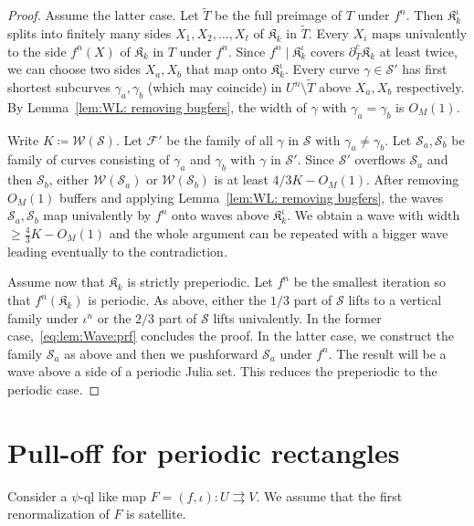 \documentclass{amsart}
\newcommand{\filled}{{\mathfrak K }}
\newcommand{\1}{{\mathbb 1 }}
\newcommand{\Fam}{{\mathcal F}}
\newcommand{\FamS}{{\mathcal S}}
\newcommand{\Width}{{\mathcal W}}
\begin{document}
\begin{proof}
Assume the latter case. Let $\widetilde T$ be the full preimage of $T$ under $f^n$. Then $\filled_k^\iota$ splits into finitely many sides $X_1,X_2,\dots, X_t$ of $\filled_k$ in $\widetilde T$. Every $X_i$ maps univalently to the side $f^n(X)$ of $\filled_k$ in $T$ under $f^n$. Since $f^n\mid \filled_k^\iota$ covers $\partial^c_T \filled_k$ at least twice, we can choose two sides $X_a,X_b$ that map onto $\filled^\iota_k$. Every curve $\gamma\in \FamS'$ has first shortest subcurves $\gamma_a, \gamma_b$ (which may coincide) in $U^n\setminus \widetilde T$ above $X_a,X_b$ respectively. By Lemma~\ref{lem:WL: removing bugfers}, the width of $\gamma$ with $\gamma_a=\gamma_b$ is $O_M(1)$.






Write $K\coloneqq \Width(\FamS)$. Let $\Fam'$ be the family of all $\gamma$ in $\FamS$ with $\gamma_a\not =\gamma_b$. Let $\FamS_a,\FamS_b$ be family of curves consisting of $\gamma_a$ and $\gamma_b$ with $\gamma$ in $\FamS'$. Since $\FamS'$ overflows $\FamS_a$ and then $ \FamS_b$, either $\Width(\FamS_a)$ or $\Width(\FamS_b)$ is at least $4/3K-O_M(1)$. After removing $O_M(1)$ buffers and applying Lemma~\ref{lem:WL: removing bugfers}, the waves $\FamS_a,\FamS_b$ map univalently by $f^n$ onto waves above $\filled_k^\iota$. We obtain a wave with width $\ge \frac 4 3 K-O_M(1)$ and the whole argument can be repeated with a bigger wave leading eventually to the contradiction.


Assume now that $\filled_k$ is strictly preperiodic. Let $f^n$ be the smallest iteration so that $f^n(\filled_k)$ is periodic. As above, either the $1/3$ part of $\FamS$ lifts to a vertical family under $\iota^n$ or the $2/3$ part of $\FamS$  lifts univalently. In the former case,~\eqref{eq:lem:Wave:prf} concludes the proof. In the latter case, we construct the family $\FamS_a$ as above and then we pushforward $\FamS_a$ under $f^n$. The result will be a wave above a side of a periodic Julia set. This reduces the preperiodic to the periodic case. 
\end{proof}


\section{Pull-off for periodic rectangles}
\label{s:Pulloff for per rectangles}



 Consider a $\psi$-ql like map $F=(f,\iota)\colon U\rightrightarrows V$. We assume that the first renormalization of $F$ is satellite.
\end{document}
